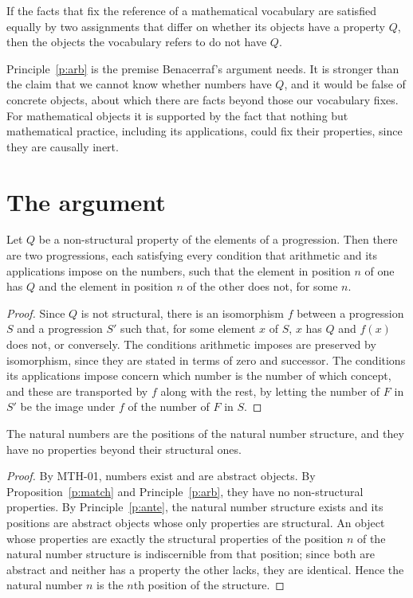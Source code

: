 \documentclass{situationist-preprint}
\begin{document}
\begin{principle}\label{p:arb}
If the facts that fix the reference of a mathematical vocabulary are satisfied equally by two assignments that differ on whether its objects have a property $Q$, then the objects the vocabulary refers to do not have $Q$.
\end{principle}

Principle~\ref{p:arb} is the premise Benacerraf's argument needs. It is stronger than the claim that we cannot know whether numbers have $Q$, and it would be false of concrete objects, about which there are facts beyond those our vocabulary fixes. For mathematical objects it is supported by the fact that nothing but mathematical practice, including its applications, could fix their properties, since they are causally inert.

\section{The argument}

\begin{proposition}\label{p:match}
Let $Q$ be a non-structural property of the elements of a progression. Then there are two progressions, each satisfying every condition that arithmetic and its applications impose on the numbers, such that the element in position $n$ of one has $Q$ and the element in position $n$ of the other does not, for some $n$.
\end{proposition}

\begin{proof}
Since $Q$ is not structural, there is an isomorphism $f$ between a progression $S$ and a progression $S'$ such that, for some element $x$ of $S$, $x$ has $Q$ and $f(x)$ does not, or conversely. The conditions arithmetic imposes are preserved by isomorphism, since they are stated in terms of zero and successor. The conditions its applications impose concern which number is the number of which concept, and these are transported by $f$ along with the rest, by letting the number of $F$ in $S'$ be the image under $f$ of the number of $F$ in $S$.
\end{proof}

\begin{theorem}\label{t:main}
The natural numbers are the positions of the natural number structure, and they have no properties beyond their structural ones.
\end{theorem}

\begin{proof}
By MTH-01, numbers exist and are abstract objects. By Proposition~\ref{p:match} and Principle~\ref{p:arb}, they have no non-structural properties. By Principle~\ref{p:ante}, the natural number structure exists and its positions are abstract objects whose only properties are structural. An object whose properties are exactly the structural properties of the position $n$ of the natural number structure is indiscernible from that position; since both are abstract and neither has a property the other lacks, they are identical. Hence the natural number $n$ is the $n$th position of the structure.
\end{proof}
\end{document}
